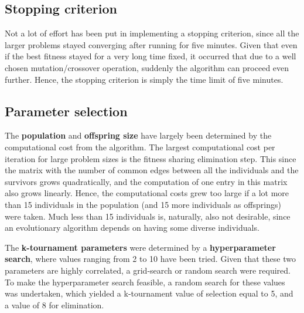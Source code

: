 \documentclass[a4paper,10pt]{article}
\newcommand{\ReplaceMe}[1]{{\color{blue}#1}}
\begin{document}
\subsection{Stopping criterion}
Not a lot of effort has been put in implementing a stopping criterion, since all the larger problems stayed converging after running for five minutes. Given that even if the best fitness stayed for a very long time fixed, it occurred that due to a well chosen mutation/crossover operation, suddenly the algorithm can proceed even further. Hence, the stopping criterion is simply the time limit of five minutes.


\subsection{Parameter selection}
\label{parameter_selection}
The \textbf{population} and \textbf{offspring size} have largely been determined by the computational cost from the algorithm. The largest computational cost per iteration for large problem sizes is the fitness sharing elimination step. This since the matrix with the number of common edges between all the individuals and the survivors grows quadratically, and the computation of one entry in this matrix also grows linearly. Hence, the computational costs grew too large if a lot more than 15 individuals in the population (and 15 more individuals as offsprings) were taken. Much less than 15 individuals is, naturally, also not desirable, since an evolutionary algorithm depends on having some diverse individuals.

The \textbf{k-tournament parameters} were determined by a \textbf{hyperparameter search}, where values ranging from 2 to 10 have been tried. Given that these two parameters are highly correlated, a grid-search or random search were required. To make the hyperparameter search feasible, a random search for these values was undertaken, which yielded a k-tournament value of selection equal to 5, and a value of 8 for elimination.
\end{document}
